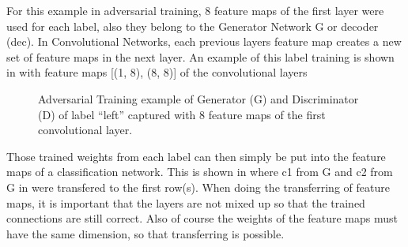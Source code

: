 For this example in adversarial training, 8 feature maps of the first layer were used for each label, also they belong to the Generator Network G or decoder (dec). In Convolutional Networks, each previous layers feature map creates a new set of feature maps in the next layer.
An example of this label training is shown in  with feature maps [(1, 8), (8, 8)] of the convolutional layers

\begin{figure}[!ht]
  \centering
  \caption{Adversarial Training example of Generator (G) and Discriminator (D) of label \enquote{left} captured with 8 feature maps of the first convolutional layer.}
  \label{fig:ml_adv_example_label}
\end{figure}
\FloatBarrier
\noindent

Those trained weights from each label can then simply be put into the feature maps of a classification network.
This is shown in  where c1 from G and c2 from G in  were transfered to the first row(s).
When doing the transferring of feature maps, it is important that the layers are not mixed up so that the trained connections are still correct.
Also of course the weights of the feature maps must have the same dimension, so that transferring is possible.


